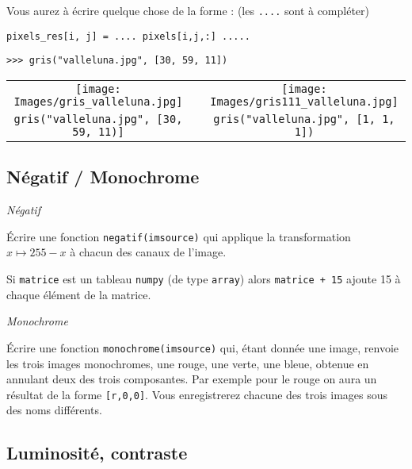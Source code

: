 \documentclass[10pt,a4paper,pdftex]{book}
\begin{document}
\begin{exoc}{}
\smallskip
Vous aurez à écrire quelque chose de la forme : (les \texttt{....} sont à compléter)
\begin{lstlisting}[style=compil]
pixels_res[i, j] = .... pixels[i,j,:] .....
\end{lstlisting}

\ex 
\begin{lstlisting}[style=compil]
>>> gris("valleluna.jpg", [30, 59, 11])
\end{lstlisting}

\begin{center}
\begin{tabular}{cp{2cm}c}
\texttt{[image: Images/gris\_valleluna.jpg]}
& &
\texttt{[image: Images/gris111\_valleluna.jpg]}
\\
\texttt{gris("valleluna.jpg", [30, 59, 11)]} & & \texttt{gris("valleluna.jpg", [1, 1, 1])}
\end{tabular}
\end{center}
\end{exoc}


\subsection{Négatif / Monochrome}

\begin{exoc}{\textit{Négatif}}

Écrire une fonction \verb!negatif(imsource)! qui applique la transformation $x \mapsto 255 - x$ à chacun des canaux de l'image. 

\Rq Si \texttt{matrice} est un tableau \texttt{numpy} (de type \texttt{array}) alors \texttt{matrice + 15} ajoute 15 à chaque élément de la matrice.
\end{exoc}

\begin{exoc}{\textit{Monochrome}}\label{monochrome}

Écrire une fonction \verb!monochrome(imsource)! qui, étant donnée une image, renvoie les trois images monochromes, une rouge, une verte, une bleue, obtenue en annulant deux des trois composantes. Par exemple pour le rouge on aura un résultat de la forme \texttt{[r,0,0]}. Vous enregistrerez chacune des trois images sous des noms différents. 
\end{exoc}

\subsection{Luminosité, contraste}
\end{document}
